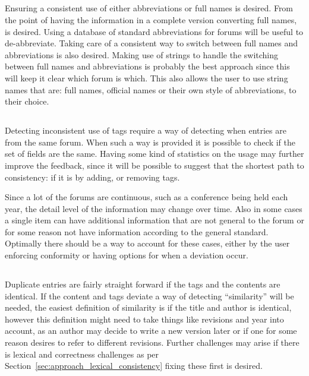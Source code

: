 \subsection{}

Ensuring a consistent use of either abbreviations or full names is
desired.  From the point of having the information in a complete
version converting full names,  is desired.
Using a database of standard abbreviations for forums will be useful
to de-abbreviate.  Taking care of a consistent way to switch between
full names and abbreviations is also desired.  Making use of strings
to handle the switching between full names and abbreviations is
probably the best approach since this will keep it clear which forum
is which.  This also allows the user to use string names that are:
full names, official names or their own style of abbreviations, to
their choice.


\subsection{}

Detecting inconsistent use of tags require a way of detecting when
entries are from the same forum.  When such a way is provided it is
possible to check if the set of fields are the same.  Having some kind
of statistics on the usage may further improve the feedback, since it
will be possible to suggest that the shortest path to consistency: if
it is by adding, or removing tags.

Since a lot of the forums are continuous, such as a conference being
held each year, the detail level of the information may change over
time.  Also in some cases a single item can have additional
information that are not general to the forum or for some reason not
have information according to the general standard.  Optimally there
should be a way to account for these cases, either by the user
enforcing conformity or having options for when a deviation occur.


\subsection{}
\label{sec:approach_duplicates}

Duplicate entries are fairly straight forward if the tags and the
contents are identical.  If the content and tags deviate a way of
detecting ``similarity'' will be needed, the easiest definition of
similarity is if the title and author is identical, however this
definition might need to take things like revisions and year into
account, as an author may decide to write a new version later or if
one for some reason desires to refer to different revisions.  Further
challenges may arise if there is lexical and correctness challenges as
per Section~\ref{sec:approach_lexical_consistency} fixing these first
is desired.


